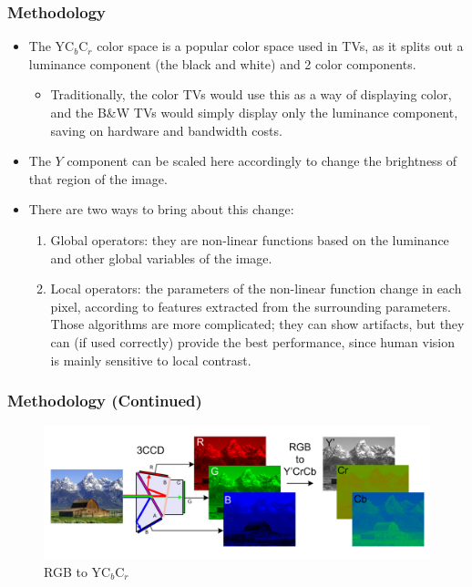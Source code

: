 \documentclass{beamer}
\begin{document}
\begin{frame}
    \frametitle{Methodology}
    \begin{itemize}
        \item The YC$_b$C$_r$ color space is a popular color space used in TVs, as it splits out a luminance component (the black and white) and 2 color components.
        \begin{itemize}
            \item Traditionally, the color TVs would use this as a way of displaying color, and the B\&W TVs would simply display only the luminance component, saving on hardware and bandwidth costs.
        \end{itemize} 
        \item The $Y$ component can be scaled here accordingly to change the brightness of that region of the image.
        \item There are two ways to bring about this change:
        \begin{enumerate}
            \item Global operators: they are non-linear functions based on the luminance and other global variables of the image.
            \item Local operators: the parameters of the non-linear function change in each pixel, according to features extracted from the surrounding parameters. Those algorithms are more complicated; they can show artifacts, but they can (if used correctly) provide the best performance, since human vision is mainly sensitive to local contrast.
        \end{enumerate}
    \end{itemize}
    

\end{frame}


\begin{frame}
    \frametitle{Methodology (Continued)}
            
            \begin{figure}
                \centering
                \includegraphics[width=.85\linewidth]{media/CCD.png}
                \caption{RGB to YC$_b$C$_r$}
            \end{figure}

\end{frame}
\end{document}
